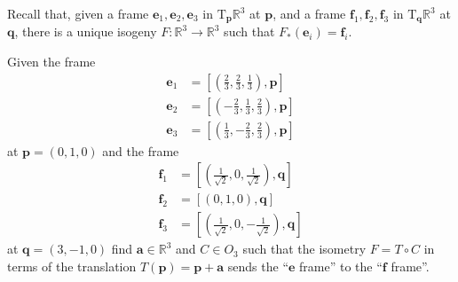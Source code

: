 \documentclass[12 pt, letterpaper]{hmcpset}
\begin{document}
\pagebreak

\begin{problem}[Problem 5.]
	Recall that, given a frame $\mathbf{e}_{1}, \mathbf{e}_{2}, \mathbf{e}_{3}$ in $\mathrm{T}_{\mathbf{p}}\mathbb{R}^{3}$ at $\mathbf{p}$, and a frame $\mathbf{f}_{1}, \mathbf{f}_{2}, \mathbf{f}_{3}$ in $\mathrm{T}_{\mathbf{q}}\mathbb{R}^{3}$	at $\mathbf{q}$, there is a unique isogeny $F : \mathbb{R}^{3} \to \mathbb{R}^{3}$ such that $F_{*}(\mathbf{e}_{i}) = \mathbf{f}_{i}$. 

	Given the frame
	\[
		\begin{split}
			\mathbf{e}_{1} & = \left [ \left ( \frac{2}{3}, \frac{2}{3}, \frac{1}{3} \right ), \mathbf{p} \right ] \\
			\mathbf{e}_{2} & = \left [ \left ( -\frac{2}{3}, \frac{1}{3}, \frac{2}{3} \right ), \mathbf{p} \right ] \\
			\mathbf{e}_{3} & = \left [ \left ( \frac{1}{3}, -\frac{2}{3}, \frac{2}{3} \right ), \mathbf{p} \right ]
		\end{split}
	\]
	at $\mathbf{p} = (0, 1, 0)$ and the frame
	\[
		\begin{split}
			\mathbf{f}_{1} & = \left [ \left ( \frac{1}{\sqrt 2}, 0, \frac{1}{\sqrt 2} \right ), \mathbf{q} \right ] \\
			\mathbf{f}_{2} & = \left [ \left ( 0, 1, 0 \right ), \mathbf{q} \right ] \\
			\mathbf{f}_{3} & = \left [ \left ( \frac{1}{\sqrt 2}, 0, -\frac{1}{\sqrt 2} \right ), \mathbf{q} \right ]
		\end{split}
	\]
	at $\mathbf{q} = (3, -1, 0)$ find $\mathbf{a} \in \mathbb{R}^{3}$ and $C \in O_{3}$ such that the isometry $F = T \circ C$ in terms of the translation $T(\mathbf{p}) = \mathbf{p} + \mathbf{a}$ sends the ``$\mathbf{e}$ frame'' to the ``$\mathbf{f}$ frame''.
\end{problem}
\end{document}
